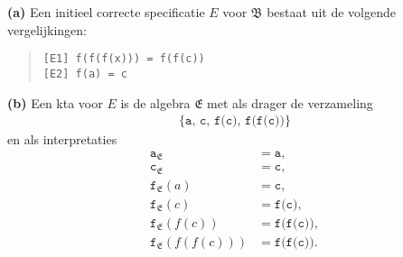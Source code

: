 \documentclass[a4paper,11pt]{article}
\begin{document}
\begin{description}

\item{\bf (a)} %
Een initieel correcte specificatie $E$ voor $\mathfrak{B}$ bestaat uit de
volgende vergelijkingen:
\begin{quote}
\begin{verbatim}
[E1] f(f(f(x))) = f(f(c))
[E2] f(a) = c
\end{verbatim}
\end{quote}

\item{\bf (b)} %
Een kta voor $E$ is de algebra $\mathfrak{E}$ met als drager de verzameling
\begin{align*}
\{\texttt{a}, \, \texttt{c}, \, \texttt{f(c)}, \, \texttt{f(f(c))}\}
\end{align*}
en als interpretaties
\begin{align*}
\texttt{a}_{\mathfrak{E}}          &= \texttt{a}, \\
\texttt{c}_{\mathfrak{E}}          &= \texttt{c}, \\
\texttt{f}_{\mathfrak{E}}(a)       &= \texttt{c}, \\
\texttt{f}_{\mathfrak{E}}(c)       &= \texttt{f(c)}, \\
\texttt{f}_{\mathfrak{E}}(f(c))    &= \texttt{f(f(c))}, \\
\texttt{f}_{\mathfrak{E}}(f(f(c))) &= \texttt{f(f(c))}.
\end{align*}

\end{description}
\end{document}
